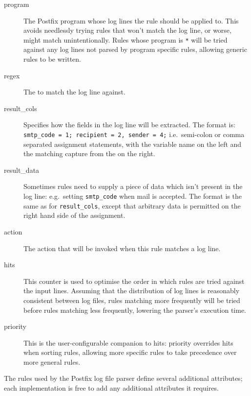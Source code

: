 \documentclass[draft]{svmult}
\newcommand{\tab}[0]{%
    \hspace*{2em}%
}
\begin{document}
\begin{description}

    \item [program] The Postfix program whose log lines the rule should be
        applied to.  This avoids needlessly trying rules that won't match
        the log line, or worse, might match unintentionally.  Rules whose
        program is \texttt{*} will be tried against any log lines not
        parsed by program specific rules, allowing generic rules to be
        written.

    \item [regex] The \regex{} to match the log line against.

    \item [result\_cols] Specifies how the fields in the log line will be
        extracted.  The format is:
        \tab{} \texttt{smtp\_code = 1; recipient = 2, sender = 4;} \newline
        i.e.\ semi-colon or comma separated assignment statements, with the
        variable name on the left and the matching capture from the
        \regex{} on the right.

    \item [result\_data] Sometimes rules need to supply a piece of data
        which isn't present in the log line: e.g.\ setting
        \texttt{smtp\_code} when mail is accepted.  The format is the same
        as for \texttt{result\_cols}, except that arbitrary data is
        permitted on the right hand side of the assignment.

    \item [action] The action that will be invoked when this rule matches a
        log line.

    \item [hits] This counter is used to optimise the order in which rules
        are tried against the input lines.  Assuming that the distribution
        of log lines is reasonably consistent between log files, rules
        matching more frequently will be tried before rules matching less
        frequently, lowering the parser's execution time.

    \item [priority] This is the user-configurable companion to hits:
        priority overrides hits when sorting rules, allowing more
        specific rules to take precedence over more general rules.

\end{description}

The rules used by the Postfix log file parser define several additional
attributes; each implementation is free to add any additional attributes it
requires.
\end{document}
